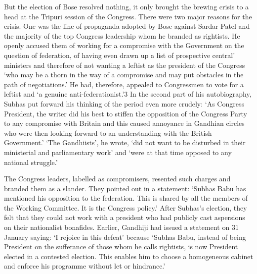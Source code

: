 But the election of Bose resolved nothing, it only brought the brewing crisis to a head at the Tripuri session of the Congress. There were two major reasons for the crisis. One was the line of propaganda adopted by Bose against Sardar Patel and the majority of the top Congress leadership whom he branded as rightists. He openly accused them of working for a compromise with the Government on the question of federation, of having even drawn up a list of prospective central' ministers and therefore of not wanting a leftist as the president of the Congress `who may be a thorn in the way of a compromise and may put obstacles in the path of negotiations.' He had, therefore, appealed to Congressmen to vote for a leftist and `a genuine anti-federationist.'3 In the second part of his autobiography, Subhas put forward his thinking of the period even more crudely: `As Congress President, the writer did his best to stiffen the opposition of the Congress Party to any compromise with Britain and this caused annoyance in Gandhian circles who were then looking forward to an understanding with the British Government.' `The Gandhiists', he wrote, `did not want to be disturbed in their ministerial and parliamentary work' and `were at that time opposed to any national struggle.' 

The Congress leaders, labelled as compromisers, resented such charges and branded them as a slander. They pointed out in a statement: `Subhas Babu has mentioned his opposition to the federation. This is shared by all the members of the Working Committee. It is the Congress policy.' After Subhas's election, they felt that they could not work with a president who had publicly cast aspersions on their nationalist bonafides. Earlier, Gandhiji had issued a statement on 31 January saying: `I rejoice in this defeat' because `Subhas Babu, instead of being President on the sufferance of those whom he calls rightists, is now President elected in a contested election. This enables him to choose a homogeneous cabinet and enforce his programme without let or hindrance.' 

